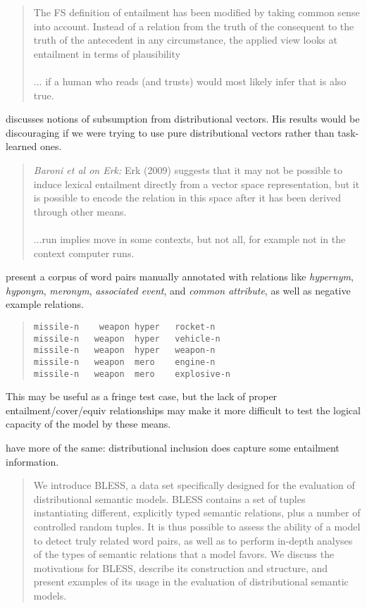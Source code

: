 \documentclass[10pt,letterpaper]{article}
\begin{document}
\begin{quote}
The FS definition of entailment has been modified
by taking common sense into account. Instead of
a relation from the truth of the consequent to the
truth of the antecedent in any circumstance, the
applied view looks at entailment in terms of plausibility \\\\... if a human who reads (and trusts) would most likely infer that is also true.
\end{quote}

 discusses notions of subsumption from distributional vectors. His results would be discouraging if we were trying to use pure distributional vectors rather than task-learned ones.

\begin{quote}
\textit{Baroni et al on Erk:} Erk (2009) suggests that it
may not be possible to induce lexical entailment
directly from a vector space representation, but it
is possible to encode the relation in this space after it has been derived through other means.\\\\
...run implies move in some contexts, but not all, for example not in the context computer runs.
\end{quote}

 present a corpus of word pairs manually annotated with relations like \textit{hypernym}, \textit{hyponym}, \textit{meronym}, \textit{associated event}, and \textit{common attribute}, as well as negative example relations.

\begin{quote}
\begin{verbatim}
missile-n    weapon	hyper	rocket-n
missile-n	weapon	hyper	vehicle-n
missile-n	weapon	hyper	weapon-n
missile-n	weapon	mero	engine-n
missile-n	weapon	mero	explosive-n
\end{verbatim}
\end{quote}

This may be useful as a fringe test case, but the lack of proper entailment/cover/equiv relationships may make it more difficult to test the logical capacity of the model by these means.

 have more of the same: distributional inclusion does capture some entailment information.

\begin{quote}
We introduce BLESS, a data set specifically
designed for the evaluation of distributional
semantic models. BLESS contains a set of tuples instantiating different, explicitly typed semantic relations, plus a number of controlled
random tuples. It is thus possible to assess the
ability of a model to detect truly related word
pairs, as well as to perform in-depth analyses of the types of semantic relations that a
model favors. We discuss the motivations for
BLESS, describe its construction and structure, and present examples of its usage in the
evaluation of distributional semantic models.
\end{quote}
\end{document}
